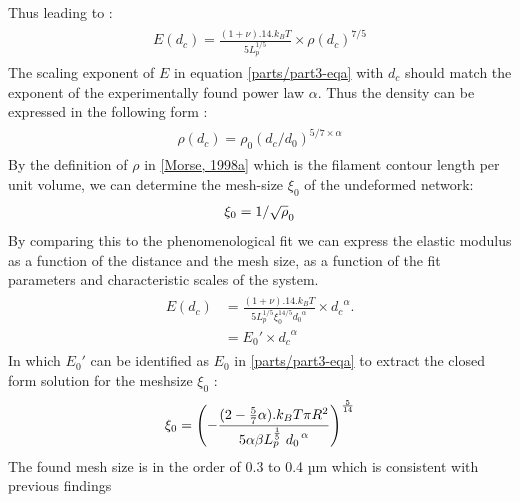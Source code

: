 \documentclass[A4paperpaper,11pt,english]{sphinxmanual}
\begin{document}
Thus leading to :
\label{parts/part3:equation-eqa}\begin{gather}
\begin{split}E(d_c)=\frac{ (1+\nu).14.k_BT}{5L_p^{1/5}}\times \rho(d_c)^{7/5}\end{split}\label{parts/part3-eqa}
\end{gather}
The scaling exponent of \(E\) in equation \eqref{parts/part3-eqa} with \(d_c\) should match the exponent
of the experimentally found power law \(\alpha\). Thus the density can be
expressed in the following form :
\label{parts/part3:equation-eq-rho}\begin{gather}
\begin{split}\rho(d_c)=\rho_0(d_c/d_0)^{5/7\times\alpha}\end{split}\label{parts/part3-eq-rho}
\end{gather}
By the definition of \(\rho\) in {\hyperref[parts/part3:morse1998a]{{[}Morse,  1998a{]}}} which is
the filament contour length per unit volume, we can determine the
mesh-size \(\xi_0\) of the undeformed network:
\begin{gather}
\begin{split}\xi_0 = 1/\sqrt\rho_0\end{split}\notag
\end{gather}
By comparing this to the phenomenological fit we can express the elastic
modulus as a function of the distance and the mesh size, as a function of the
fit parameters and characteristic scales of the system.
\label{parts/part3:equation-eqb}\begin{gather}
\begin{split}E(d_c)     &=  \frac{(1+\nu).14.k_BT}{5L_p^{1/5}\xi_0^{14/5} \left.d_0\right.^{\alpha}}\times \left.d_c\right.^{\alpha}.\\
                &=  E_0' \times \left.d_c\right.^{\alpha}\end{split}\label{parts/part3-eqb}
\end{gather}
In which \(E_0'\) can be identified as \(E_0\) in \eqref{parts/part3-eqa} to extract the
closed form solution for the meshsize \(\xi_0\) :
\begin{gather}
\begin{split}\xi_0=\left(-\frac{({2-\frac{5}{7}\alpha)}.k_BT\pi R^2}{5\alpha \beta L_p^{\frac{1}{5}}\left.d_0\right.^{\alpha}}\right)^{\frac{5}{14}}\end{split}\notag
\end{gather}
The found mesh size is in the order of 0.3 to 0.4 µm which is consistent with previous findings
\end{document}
